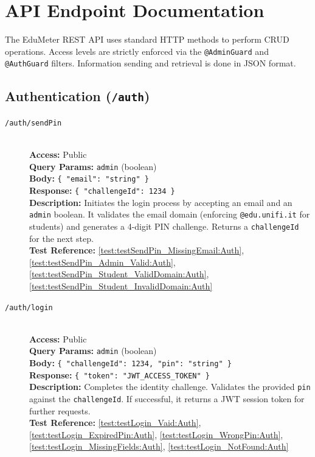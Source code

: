 \section{API Endpoint Documentation}
The EduMeter REST API uses standard HTTP methods to perform CRUD operations. Access levels are strictly enforced via the \texttt{@AdminGuard} and \texttt{@AuthGuard} filters. Information sending and retrieval is done in JSON format. 

\subsection{Authentication (\texttt{/auth})}
\begin{description}
	\item[\POST \quad \texttt{/auth/sendPin}] \hfill \\
	\textbf{Access:} Public \\
	\textbf{Query Params:} \texttt{admin} (boolean) \\
	\textbf{Body:} \texttt{\{ "email": "string" \}} \\
	\textbf{Response:} \texttt{\{ "challengeId": 1234 \}} \\
	\textbf{Description:} Initiates the login process by accepting an email and an \texttt{admin} boolean. It validates the email domain (enforcing \texttt{@edu.unifi.it} for students) and generates a 4-digit PIN challenge. Returns a \texttt{challengeId} for the next step. \\
	\textbf{Test Reference:} \ref{test:testSendPin_MissingEmail:Auth}, \ref{test:testSendPin_Admin_Valid:Auth}, \ref{test:testSendPin_Student_ValidDomain:Auth}, \ref{test:testSendPin_Student_InvalidDomain:Auth}
	
	\item[\POST \quad \texttt{/auth/login}] \hfill \\
	\textbf{Access:} Public \\
	\textbf{Query Params:} \texttt{admin} (boolean) \\
	\textbf{Body:} \texttt{\{ "challengeId": 1234, "pin": "string" \}} \\
	\textbf{Response:} \texttt{\{ "token": "JWT\_ACCESS\_TOKEN" \}} \\
	\textbf{Description:} Completes the identity challenge. Validates the provided \texttt{pin} against the \texttt{challengeId}. If successful, it returns a JWT session token for further requests.\\
	\textbf{Test Reference:} \ref{test:testLogin_Vaid:Auth}, \ref{test:testLogin_ExpiredPin:Auth}, \ref{test:testLogin_WrongPin:Auth}, \ref{test:testLogin_MissingFields:Auth}, \ref{test:testLogin_NotFound:Auth}
	

\end{description}
